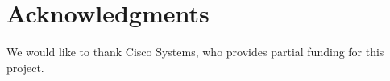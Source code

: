 \documentclass{acm_proc_article-sp}
\begin{document}
\section{Acknowledgments}
We would like to thank Cisco Systems, who provides partial funding for this
project.


%
%
\end{document}
